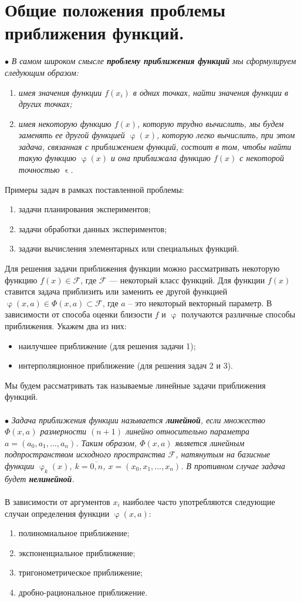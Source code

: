 \documentclass[a4paper, 12pt]{report}
\numberwithin{equation}{section}
\renewcommand{\varphi}{\upvarphi}
\renewcommand{\varepsilon}{\upvarepsilon}
\begin{document}
\section{Общие положения проблемы приближения функций.}
$\bullet$ \textit{В самом широком смысле \textbf{проблему приближения функций} мы сформулируем следующим образом:}\begin{enumerate}
	\item \textit{имея значения функции $f(x_i)$ в одних точках, найти значения функции в других точках;}
	\item \textit{имея некоторую функцию $f(x)$, которую трудно вычислить, мы будем заменять ее другой функцией $\varphi(x)$, которую легко вычислить, при этом задача, связанная с приближением функций, состоит в том, чтобы найти такую функцию $\varphi(x)$ и она приближала функцию $f(x)$ с некоторой точностью $\varepsilon$.}
\end{enumerate}
Примеры задач в рамках поставленной проблемы:
\begin{enumerate}
	\item задачи планирования экспериментов;
	\item задачи обработки данных экспериментов;
	\item задачи вычисления элементарных или специальных функций.
\end{enumerate}
Для решения задачи приближения функции можно рассматривать некоторую функцию $f(x) \in \mathcal F$, где $\mathcal F$ --- некоторый класс функций. Для функции $f(x)$ ставится задача приблизить или заменить ее другой функцией $\varphi(x,a)\in \Phi (x, a)\subset \mathcal F$, где $a$ -- это некоторый векторный параметр. В зависимости от способа оценки близости $f$ и $\varphi$ получаются различные способы приближения. Укажем два из них:
\begin{itemize}
	\item наилучшее приближение (для решения задачи 1);
	\item интерполяционное приближение (для решения задач 2 и 3).
\end{itemize}
Мы будем рассматривать так называемые линейные задачи приближения функций.
\\\\ 
$\bullet$ \textit{Задача приближения функции называется \textbf{линейной}, если множество $\Phi(x,a)$ размерности $(n+1)$ линейно относительно параметра $a=(a_0,a_1,\ldots, a_n)$. Таким образом, $\Phi(x,a)$ является линейным подпространством исходного пространства $\mathcal{F}$, натянутым на базисные функции $\varphi_k(x)$, $k=\overline{0,n}$, $x = (x_0,x_1,\ldots, x_n)$. В противном случае задача будет \textbf{нелинейной}.}\\\\ 
В зависимости от аргументов $x_i$ наиболее часто употребляются следующие случаи определения функции $\varphi(x,a)$:
\begin{enumerate}
	\item полиномиальное приближение;
	\item экспоненциальное приближение;
	\item тригонометрическое приближение;
	\item дробно-рациональное приближение.
\end{enumerate}
\end{document}

